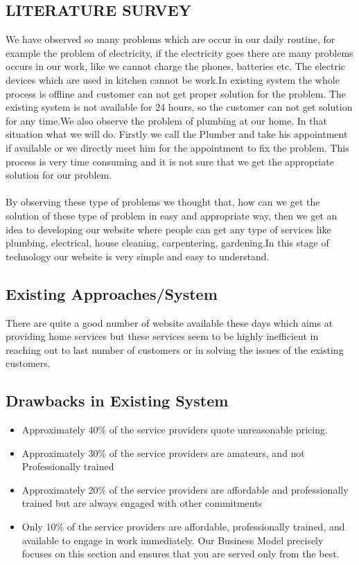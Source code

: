 \documentclass[12pt,a4paper]{report}
\begin{document}
\begin{titlepage}
{\chapter{ LITERATURE SURVEY}
We have observed so many problems which are occur in our daily routine, for example the problem of electricity, if the electricity goes there are many problems occurs in our work, like we cannot charge the phones, batteries etc. The electric devices which are used in kitchen cannot be work.In existing system the whole process is offline and customer can not get proper solution for the problem. The existing system is not available for 24 hours, so the customer can not get solution for any time.We also observe the problem of plumbing at our home. In that situation what we will do. Firstly we call the Plumber and take his appointment if available or we directly meet him for the appointment to fix the problem. This process is very time consuming and it is not sure that we get the appropriate solution for our problem.\\ \\
By observing these type of problems we thought that, how can we get the solution of these type of  problem in easy and appropriate way, then we get an idea to developing our website where people can get any type of services like plumbing, electrical, house cleaning, carpentering, gardening.In this stage of technology our website is very simple and easy to understand. 
\vspace{0.5cm}
\section{ Existing Approaches/System }
\vspace{0.5cm}
There are quite a good number of website available these days which aims at providing home services but these services seem to be highly inefficient in reaching out to last number of customers or in solving the issues of the existing customers.\\
\section{ Drawbacks in Existing System }
\vspace{0.5cm}
\begin{itemize}
	\item Approximately 40\% of the service providers quote unreasonable pricing.
    \item Approximately 30\% of the service providers are amateurs, and not Professionally trained
    \item Approximately 20\% of the service providers are affordable and professionally trained but are always
    engaged with other commitments
    \item Only 10\% of the service providers are affordable, professionally trained, and available to engage in
    work immediately. Our Business Model precisely focuses on this section and ensures that you are served only from the best.
\end{itemize}
}
\end{titlepage}
\end{document}
